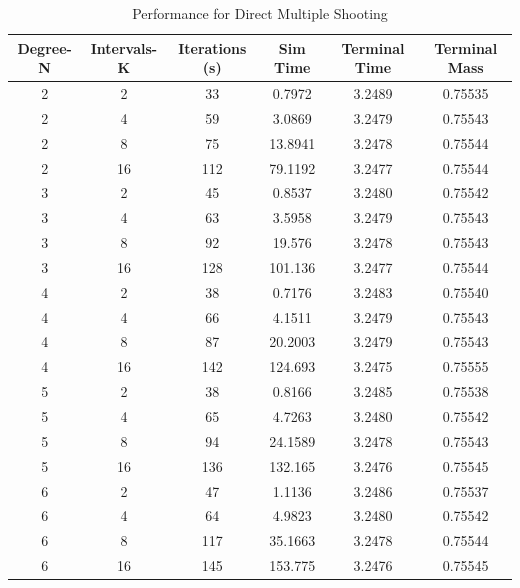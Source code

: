\documentclass[]{article}
\begin{document}
\begin{table}
	\centering
	\begin{tabular}{||c c c c c c||} 
		\hline
		Degree-N & Intervals-K & Iterations (s) & Sim Time & Terminal Time & Terminal Mass\\ [0.5ex] 
		\hline\hline
		2        & 2           & 33             & 0.7972   & 3.2489     & 0.75535\\ 
		\hline
		2        & 4           & 59             & 3.0869   & 3.2479     & 0.75543\\
		\hline
		2        & 8           & 75             & 13.8941  & 3.2478     & 0.75544\\
		\hline
		2        & 16          & 112            & 79.1192  & 3.2477     & 0.75544\\
		\hline
		3        & 2           & 45             & 0.8537   & 3.2480     & 0.75542\\
		\hline
		3        & 4           & 63             & 3.5958   & 3.2479     & 0.75543\\
		\hline
		3        & 8           & 92             & 19.576   & 3.2478     & 0.75543\\
		\hline
		3        & 16          & 128            & 101.136  & 3.2477     & 0.75544\\
		\hline
		4        & 2           & 38             & 0.7176   & 3.2483     & 0.75540\\
		\hline
		4        & 4           & 66             & 4.1511   & 3.2479     & 0.75543\\
		\hline
		4        & 8           & 87             & 20.2003  & 3.2479     & 0.75543\\
		\hline
		4        & 16          & 142            & 124.693  & 3.2475     & 0.75555\\
		\hline
		5        & 2           & 38             & 0.8166   & 3.2485     & 0.75538\\
		\hline
		5        & 4           & 65             & 4.7263   & 3.2480     & 0.75542\\
		\hline
		5        & 8           & 94             & 24.1589  & 3.2478     & 0.75543\\
		\hline
		5        & 16          & 136            & 132.165  & 3.2476     & 0.75545\\
		\hline
		6        & 2           & 47             & 1.1136   & 3.2486     & 0.75537\\
		\hline
		6        & 4           & 64             & 4.9823   & 3.2480     & 0.75542\\
		\hline
		6        & 8           & 117            & 35.1663  & 3.2478     & 0.75544\\
		\hline
		6        & 16          & 145            & 153.775  & 3.2476     & 0.75545\\ [1ex]
		\hline
	\end{tabular}
	\caption{Performance for Direct Multiple Shooting}
	\label{table:4}
\end{table}
\end{document}
